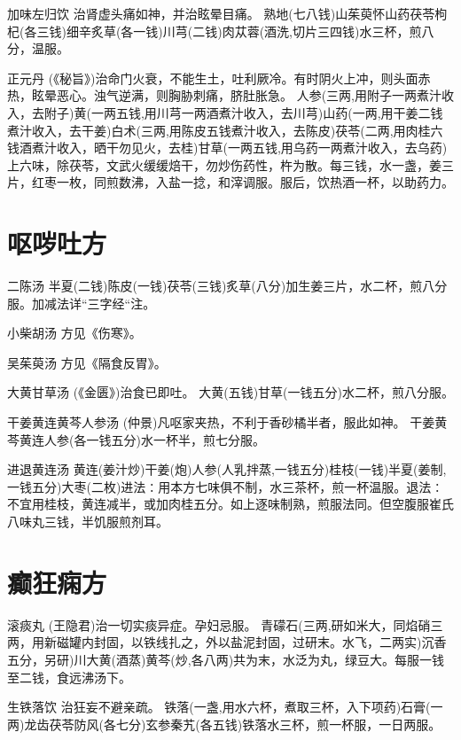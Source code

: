\documentclass[a4paper,12pt,UTF8,twoside]{ctexbook}
\begin{document}
	加味左归饮
	治肾虚头痛如神，并治眩晕目痛。
	熟地(七八钱)山茱萸怀山药茯苓枸杞(各三钱)细辛炙草(各一钱)川芎(二钱)肉苁蓉(酒洗,切片三四钱)水三杯，煎八分，温服。
	
	正元丹
	(《秘旨》)治命门火衰，不能生土，吐利厥冷。有时阴火上冲，则头面赤热，眩晕恶心。浊气逆满，则胸胁刺痛，脐肚胀急。
	人参(三两,用附子一两煮汁收入，去附子)黄(一两五钱,用川芎一两酒煮汁收入，去川芎)山药(一两,用干姜二钱煮汁收入，去干姜)白术(三两,用陈皮五钱煮汁收入，去陈皮)茯苓(二两,用肉桂六钱酒煮汁收入，晒干勿见火，去桂)甘草(一两五钱,用乌药一两煮汁收入，去乌药)上六味，除茯苓，文武火缓缓焙干，勿炒伤药性，杵为散。每三钱，水一盏，姜三片，红枣一枚，同煎数沸，入盐一捻，和滓调服。服后，饮热酒一杯，以助药力。
	
	

	\chapter{呕哕吐方}
	
	
	二陈汤
	半夏(二钱)陈皮(一钱)茯苓(三钱)炙草(八分)加生姜三片，水二杯，煎八分服。加减法详“三字经“注。
	
	小柴胡汤
	方见《伤寒》。
	
	吴茱萸汤
	方见《隔食反胃》。
	
	大黄甘草汤
	(《金匮》)治食已即吐。
	大黄(五钱)甘草(一钱五分)水二杯，煎八分服。
	
	干姜黄连黄芩人参汤
	(仲景)凡呕家夹热，不利于香砂橘半者，服此如神。
	干姜黄芩黄连人参(各一钱五分)水一杯半，煎七分服。
	
	进退黄连汤
	黄连(姜汁炒)干姜(炮)人参(人乳拌蒸,一钱五分)桂枝(一钱)半夏(姜制,一钱五分)大枣(二枚)进法∶用本方七味俱不制，水三茶杯，煎一杯温服。退法∶不宜用桂枝，黄连减半，或加肉桂五分。如上逐味制熟，煎服法同。但空腹服崔氏八味丸三钱，半饥服煎剂耳。
	
	
	
	
	\chapter{癫狂痫方}
	
	
	滚痰丸
	(王隐君)治一切实痰异症。孕妇忌服。
	青礞石(三两,研如米大，同焰硝三两，用新磁罐内封固，以铁线扎之，外以盐泥封固，过研末。水飞，二两实)沉香五分，另研)川大黄(酒蒸)黄芩(炒,各八两)共为末，水泛为丸，绿豆大。每服一钱至二钱，食远沸汤下。
	
	生铁落饮
	治狂妄不避亲疏。
	铁落(一盏,用水六杯，煮取三杯，入下项药)石膏(一两)龙齿茯苓防风(各七分)玄参秦艽(各五钱)铁落水三杯，煎一杯服，一日两服。
	
\end{document}
